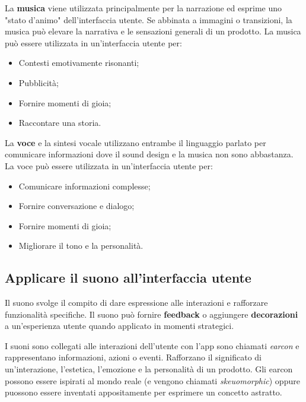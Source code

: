 \documentclass[12pt, a4paper]{report}
\begin{document}
        La \textbf{musica} viene utilizzata principalmente per la narrazione ed esprime uno "stato d'animo" dell'interfaccia utente.
        Se abbinata a immagini o transizioni, la musica può elevare la narrativa e le sensazioni generali di un prodotto.
        La musica può essere utilizzata in un'interfaccia utente per:
        \begin{itemize}
    	    \item Contesti emotivamente risonanti;
    	    \item Pubblicità;
    	    \item Fornire momenti di gioia;
    	    \item Raccontare una storia.
        \end{itemize}


        La \textbf{voce} e la sintesi vocale utilizzano entrambe il linguaggio parlato per comunicare informazioni dove il sound
        design e la musica non sono abbastanza. La voce può essere utilizzata in un'interfaccia utente per:
        \begin{itemize}
    		\item Comunicare informazioni complesse;
       		\item Fornire conversazione e dialogo;
       		\item Fornire momenti di gioia;
       		\item Migliorare il tono e la personalità.
        \end{itemize}


              \subsection{Applicare il suono all'interfaccia utente}
              	Il suono svolge il compito di dare espressione alle interazioni e rafforzare funzionalità specifiche.
               	Il suono può fornire \textbf{feedback} o aggiungere \textbf{decorazioni} a un'esperienza utente quando applicato in momenti strategici.


               	I suoni sono collegati alle interazioni dell’utente con l’app sono chiamati \textit{earcon} e rappresentano informazioni, azioni o eventi. Rafforzano il significato di un'interazione,
               	l'estetica, l'emozione e la personalità di un prodotto. Gli earcon possono essere ispirati al mondo reale (e vengono chiamati \textit{skeuomorphic}) oppure puossono essere inventati
               	appositamente per esprimere un concetto astratto.
\end{document}
